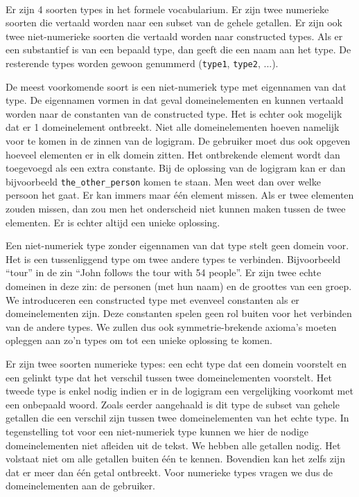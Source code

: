 \paragraph{}Er zijn 4 soorten types in het formele vocabularium. Er zijn twee numerieke soorten die vertaald worden naar een subset van de gehele getallen. Er zijn ook twee niet-numerieke soorten die vertaald worden naar constructed types. Als er een substantief is van een bepaald type, dan geeft die een naam aan het type. De resterende types worden gewoon genummerd (\texttt{type1}, \texttt{type2}, ...).

De meest voorkomende soort is een niet-numeriek type met eigennamen van dat type. De eigennamen vormen in dat geval domeinelementen en kunnen vertaald worden naar de constanten van de constructed type. Het is echter ook mogelijk dat er 1 domeinelement ontbreekt. Niet alle domeinelementen hoeven namelijk voor te komen in de zinnen van de logigram. De gebruiker moet dus ook opgeven hoeveel elementen er in elk domein zitten. Het ontbrekende element wordt dan toegevoegd als een extra constante. Bij de oplossing van de logigram kan er dan bijvoorbeeld \texttt{the\_other\_person} komen te staan. Men weet dan over welke persoon het gaat. Er kan immers maar één element missen. Als er twee elementen zouden missen, dan zou men het onderscheid niet kunnen maken tussen de twee elementen. Er is echter altijd een unieke oplossing.

Een niet-numeriek type zonder eigennamen van dat type stelt geen domein voor. Het is een tussenliggend type om twee andere types te verbinden. Bijvoorbeeld ``tour'' in de zin ``John follows the tour with 54 people''. Er zijn twee echte domeinen in deze zin: de personen (met hun naam) en de groottes van een groep. We introduceren een constructed type met evenveel constanten als er domeinelementen zijn. Deze constanten spelen geen rol buiten voor het verbinden van de andere types. We zullen dus ook symmetrie-brekende axioma's moeten opleggen aan zo'n types om tot een unieke oplossing te komen.

Er zijn twee soorten numerieke types: een echt type dat een domein voorstelt en een gelinkt type dat het verschil tussen twee domeinelementen voorstelt. Het tweede type is enkel nodig indien er in de logigram een vergelijking voorkomt met een onbepaald woord. Zoals eerder aangehaald is dit type de subset van gehele getallen die een verschil zijn tussen twee domeinelementen van het echte type. In tegenstelling tot voor een niet-numeriek type kunnen we hier de nodige domeinelementen niet afleiden uit de tekst. We hebben alle getallen nodig. Het volstaat niet om alle getallen buiten één te kennen. Bovendien kan het zelfs zijn dat er meer dan één getal ontbreekt. Voor numerieke types vragen we dus de domeinelementen aan de gebruiker.

